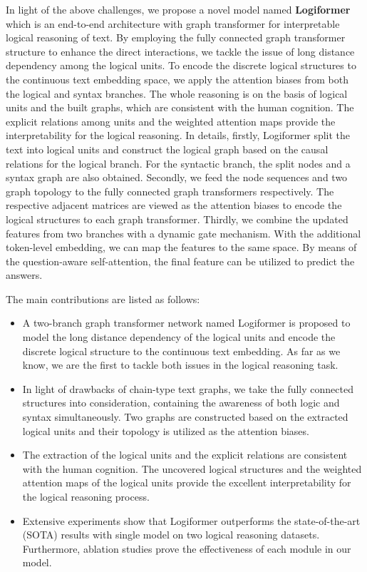\documentclass[sigconf]{acmart}
\begin{document}
In light of the above challenges, we propose a novel model named 
\textbf{Logiformer} which is an end-to-end architecture with graph transformer 
for interpretable logical reasoning of text. By employing the fully connected 
graph transformer structure to enhance the direct interactions, we tackle the 
issue of long distance dependency among the logical units. To encode the 
discrete logical structures to the continuous text embedding space, we apply 
the attention biases from both the logical and syntax branches. The whole 
reasoning is on the basis of logical units and the built graphs, which are 
consistent with the human cognition. The explicit relations among units and the 
weighted attention maps provide the interpretability for the logical reasoning. 
In details, firstly, Logiformer split the text into logical units and construct 
the logical graph based on the causal relations for the logical branch. For the 
syntactic branch, the split nodes and a syntax graph are also obtained. 
Secondly, we feed the node sequences and two graph topology to the fully 
connected graph transformers respectively. The respective adjacent matrices are 
viewed as the attention biases to encode the logical structures to each graph 
transformer. Thirdly, we combine the updated features from two branches with a 
dynamic gate mechanism. With the additional token-level embedding, we can map 
the features to the same space. By means of the question-aware self-attention, 
the final feature can be utilized to predict the answers.

The main contributions are listed as follows:

\begin{itemize}
	\item A two-branch graph transformer network named Logiformer is proposed to model the long distance dependency of the logical units and encode the discrete logical structure to the continuous text embedding. As far as we know, we are the first to tackle both issues in the logical reasoning task.
	\item In light of drawbacks of chain-type text graphs, we take the fully connected structures into consideration, containing the awareness of both logic and syntax simultaneously. Two graphs are constructed based on the extracted logical units and their topology is utilized as the attention biases.
	\item The extraction of the logical units and the explicit relations are consistent with the human cognition. The uncovered logical structures and the weighted attention maps of the logical units provide the excellent interpretability for the logical reasoning process.
	\item Extensive experiments show that Logiformer outperforms the state-of-the-art (SOTA) results with single model on two logical reasoning datasets. Furthermore, ablation studies prove the effectiveness of each module in our model.
\end{itemize}
\end{document}
